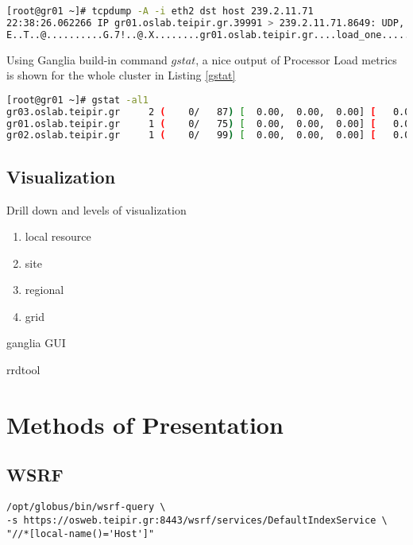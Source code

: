 \begin{lstlisting}[language=bash,caption=XDR sample]
[root@gr01 ~]# tcpdump -A -i eth2 dst host 239.2.11.71
22:38:26.062266 IP gr01.oslab.teipir.gr.39991 > 239.2.11.71.8649: UDP, length 56
E..T..@..........G.7!..@.X........gr01.oslab.teipir.gr....load_one........%.2f..
\end{lstlisting}

Using Ganglia build-in command $gstat$, a nice output of Processor Load metrics is shown for the whole cluster in Listing \ref{gstat}

\begin{lstlisting}[language=bash,caption=Gstat output,label=gstat]
[root@gr01 ~]# gstat -al1
gr03.oslab.teipir.gr     2 (    0/   87) [  0.00,  0.00,  0.00] [   0.0,   0.0,   0.0,  99.9,   0.1] OFF
gr01.oslab.teipir.gr     1 (    0/   75) [  0.00,  0.00,  0.00] [   0.0,   0.0,   0.0,  99.9,   0.0] OFF
gr02.oslab.teipir.gr     1 (    0/   99) [  0.00,  0.00,  0.00] [   0.0,   0.0,   0.1,  99.9,   0.0] OFF
\end{lstlisting}

\subsection{Visualization}
Drill down and levels of visualization
\begin{enumerate}
  \item local resource
  \item site
  \item regional
  \item grid
\end{enumerate}

ganglia GUI

rrdtool

\section{Methods of Presentation}


\subsection{WSRF}
\begin{verbatim}
/opt/globus/bin/wsrf-query \
-s https://osweb.teipir.gr:8443/wsrf/services/DefaultIndexService \
"//*[local-name()='Host']"
\end{verbatim}


